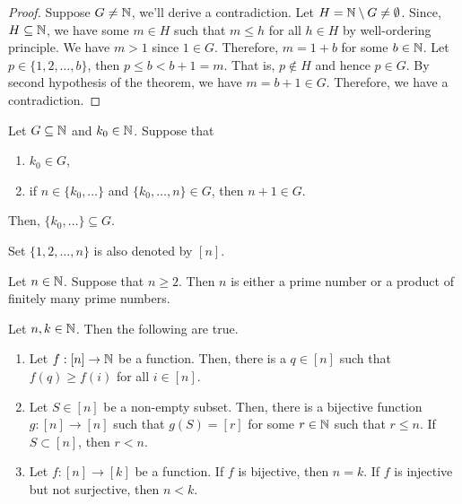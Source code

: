 \documentclass[a4paper,english,12pt]{article}
\begin{document}
\begin{proof} Suppose $G \neq \mathbb{N}$, we'll derive a contradiction. Let $H = \mathbb{N} \setminus G \neq \emptyset$. Since, $H \subseteq \mathbb{N}$, we have some $m \in H$ such that $m \leq h$ for all $h \in H$ by well-ordering principle. We have $m > 1$ since $1 \in G$. Therefore, $m = 1 +b$ for some $b \in \mathbb{N}$. Let $p \in \{1,2,\ldots,b\}$, then $p \leq b < b+1 = m$. That is, $p \notin H$ and hence $p \in G$. By second hypothesis of the theorem, we have $m = b+1 \in G$. Therefore, we have a contradiction.
\end{proof}
\begin{thm} Let $G \subseteq \mathbb{N}$ and $k_0 \in \mathbb{N}$. Suppose that
\begin{enumerate}
	\item $k_0 \in G$,
	\item if $n \in \{k_0,\ldots\}$ and $\{k_0, \ldots, n\} \in G$, then $n+1 \in G$.
\end{enumerate}
Then, $\{k_0,\ldots\} \subseteq G$.
\end{thm}
\begin{defn} Set $\{1,2,\ldots,n\}$ is also denoted by $[n]$.
\end{defn}
\begin{exmp} Let $n \in \mathbb{N}$. Suppose that $n \geq 2$. Then $n$ is either a prime number or a product of finitely many prime numbers.
\end{exmp}
\begin{thm} Let $n,k \in \mathbb{N}$. Then the following are true.
\begin{enumerate}
	\item Let $f:[n] \to \mathbb{N}$ be a function. Then, there is a $q \in [n]$ such that $f(q) \geq f(i)$ for all $i \in [n]$.
	\item Let $S \in [n]$ be a non-empty subset. Then, there is a bijective function $g: [n] \to [n]$ such that $g(S) = [r]$ for some $r \in \mathbb{N}$ such that $r \leq n$. If $S \subset [n]$, then $r < n$.
	\item Let $f: [n] \to [k]$ be a function. If $f$ is bijective, then $n = k$. If $f$ is injective but not surjective, then $n < k$.
\end{enumerate}
\end{thm}
\end{document}
